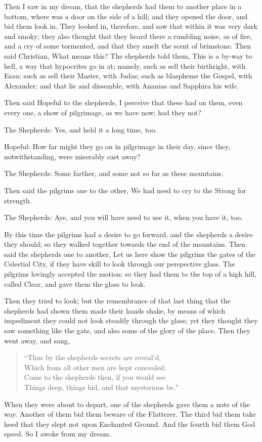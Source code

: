 Then I saw in my dream, that the shepherds had them to another place in a bottom, where was a door on the side of a hill; and they opened the door, and bid them look in. They looked in, therefore, and saw that within it was very dark and smoky; they also thought that they heard there a rumbling noise, as of fire, and a cry of some tormented, and that they smelt the scent of brimstone. Then said Christian, What means this? The shepherds told them, This is a by-way to hell, a way that hypocrites go in at; namely, such as sell their birthright, with Esau; such as sell their Master, with Judas; such as blaspheme the Gospel, with Alexander; and that lie and dissemble, with Ananias and Sapphira his wife.

Then said Hopeful to the shepherds, I perceive that these had on them, even every one, a show of pilgrimage, as we have now; had they not?

The Shepherds: Yes, and held it a long time, too.

Hopeful: How far might they go on in pilgrimage in their day, since they, notwithstanding, were miserably cast away?

The Shepherds: Some farther, and some not so far as these mountains.

Then said the pilgrims one to the other, We had need to cry to the Strong for strength.

The Shepherds: Aye, and you will have need to use it, when you have it, too.

By this time the pilgrims had a desire to go forward, and the shepherds a desire they should; so they walked together towards the end of the mountains. Then said the shepherds one to another, Let us here show the pilgrims the gates of the Celestial City, if they have skill to look through our perspective glass. The pilgrims lovingly accepted the motion: so they had them to the top of a high hill, called Clear, and gave them the glass to look.

Then they tried to look; but the remembrance of that last thing that the shepherds had shown them made their hands shake, by means of which impediment they could not look steadily through the glass; yet they thought they saw something like the gate, and also some of the glory of the place. Then they went away, and sang,
\begin{verse}
 ``Thus by the shepherds secrets are reveal'd,\\
Which from all other men are kept concealed:\\
Come to the shepherds then, if you would see\\
Things deep, things hid, and that mysterious be."\\
\end{verse}
When they were about to depart, one of the shepherds gave them a note of the way. Another of them bid them beware of the Flatterer. The third bid them take heed that they slept not upon Enchanted Ground. And the fourth bid them God speed. So I awoke from my dream. 
